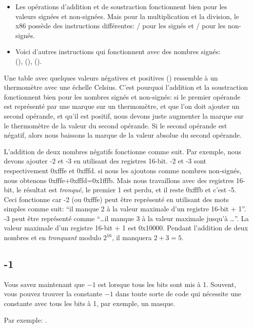 \begin{itemize}
\item
	Les opérations d'addition et de soustraction fonctionnent bien pour les valeurs signées et non-signées.
	Mais pour la multiplication et la division, le x86 possède des instructions différentes:
	/ pour les signés et / pour les non-signés.
\item
	Voici d'autres instructions qui fonctionnent avec des nombres signés:\\
	 (),  (),  ().
\end{itemize}

Une table avec quelques valeurs négatives et positives () ressemble
à un thermomètre avec une échelle Celsius.
C'est pourquoi l'addition et la soustraction fonctionnent bien pour les nombres signés
et non-signés:
si le premier opérande est représenté par une marque sur un thermomètre, et que l'on
doit ajouter un second opérande, et qu'il est positif, nous devons juste augmenter
la marque sur le thermomètre de la valeur du second opérande.
Si le second opérande est négatif, alors nous baissons la marque de la valeur absolue
du second opérande.

L'addition de deux nombres négatifs fonctionne comme suit.
Par exemple, nous devons ajouter -2 et -3 en utilisant des registres 16-bit.
-2 et -3 sont respectivement 0xfffe et 0xfffd.
si nous les ajoutons comme nombres non-signés, nous obtenons 0xfffe+0xfffd=0x1fffb.
Mais nous travaillons avec des registres 16-bit, le résultat est \emph{tronqué},
le premier 1 est perdu, et il reste 0xfffb et c'est -5.
Ceci fonctionne car -2 (ou 0xfffe) peut être représenté en utilisant des mots simples
comme suit:
``il manque 2 à la valeur maximale d'un registre 16-bit + 1''.
-3 peut être représenté comme ``\dots il manque 3 à la valeur maximale jusqu'à \dots''.
La valeur maximale d'un registre 16-bit + 1 est 0x10000.
Pendant l'addition de deux nombres et en \emph{tronquant} modulo $2^{16}$, il manquera
$2+3=5$.




\subsection{-1}

Vous savez maintenant que $-1$ est lorsque tous les bits sont mis à 1.
Souvent, vous pouvez trouver la constante $-1$ dans toute sorte de code qui nécessite
une constante avec tous les bits à 1, par exemple, un masque.

Par exemple: .

